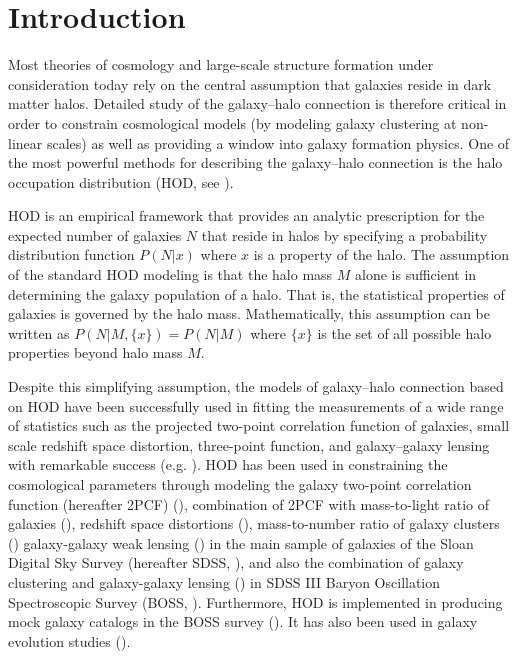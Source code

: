 \documentclass[twocolumn]{aastex61}
\begin{document}

\section{Introduction}
Most theories of cosmology and large-scale structure formation under consideration today rely on the central assumption that galaxies reside in dark matter halos. Detailed study of the galaxy--halo connection is therefore critical in order to constrain cosmological models (by modeling galaxy clustering at non-linear scales) as well as providing a window into galaxy formation physics. One of the most powerful methods for describing the galaxy--halo connection is the halo occupation 
distribution (HOD, see \citealt{seljak2000, berlind_weinberg2002, scoccimarro2001, zheng2005, zheng07, leauthaud12, tinker2013, decorated, 2016arXiv160701782H}).

HOD is an empirical framework that provides an analytic prescription for the expected number of galaxies $N$ that reside in halos by specifying a probability distribution function $P(N|x)$ where $x$ is a property of the halo. The assumption of the standard HOD modeling is that the halo mass $M$ alone is sufficient in determining the galaxy population of a halo. That is, the statistical properties of galaxies is governed by the halo mass. Mathematically, this assumption can be written as $P(N|M,\{x\})=P(N|M)$ where $\{x\}$ is the set of all possible halo properties beyond halo mass $M$.

Despite this simplifying assumption, the models of galaxy--halo connection based on HOD have been successfully used in fitting the measurements of a wide range of statistics such as the projected two-point correlation function of galaxies, small scale redshift space distortion, three-point function, and galaxy--galaxy lensing with remarkable success (e.g. \citealt{zheng07,tinker_rsd2007,zehavi2011,leauthaud12,parejko2013,coupon2015,hod-3pcf,guo2015,miyatake15,zu2015,hod_vs_sham}). 
HOD has been used in constraining the cosmological parameters through modeling the galaxy two-point correlation function (hereafter 2PCF) (\citealt{abazajian2005}), combination of 2PCF with mass-to-light ratio of galaxies (\citealt{tinker05}), redshift space distortions (\citealt{tinker_rsd2007}), mass-to-number ratio of galaxy clusters (\citealt{tinker2012}) galaxy-galaxy weak lensing (\citealt{vdb03,cacciato13,more13,vdb13}) in the main sample of galaxies
of the Sloan Digital Sky Survey (hereafter SDSS, \citealt{york2000}), and also the combination of galaxy clustering and galaxy-galaxy lensing (\citealt{more15}) in SDSS III Baryon Oscillation Spectroscopic Survey (BOSS, \citealt{boss}). Furthermore, HOD is implemented in producing mock galaxy catalogs in the BOSS survey (\citealt{manera2013,white2014}). It has also been used in galaxy evolution studies (\citealt{conroy2009,leauthaud12,behroozi13,hudson2015,zu2015,zu2016}).
\end{document}
